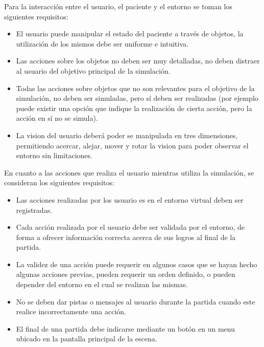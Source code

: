 Para la interacción entre el usuario, el paciente y el entorno se toman los
siguientes requisitos:

\begin{itemize}
\item El usuario puede manipular el estado del paciente a través de objetos, la
    utilización de los mismos debe ser uniforme e intuitiva.

\item Las acciones sobre los objetos no deben ser muy detalladas, no deben
    distraer al usuario del objetivo principal de la simulación.

\item Todas las acciones sobre objetos que no son relevantes para el objetivo de
    la simulación, no deben ser simuladas, pero sí deben ser realizadas (por
    ejemplo puede existir una opción que indique la realización de cierta
    acción, pero la acción en sí no se simula).

\item La vision del usuario deberá poder se manipulada en tres dimensiones,
    permitiendo acercar, alejar, mover y rotar la vision para poder observar el
    entorno sin limitaciones.

\end{itemize}

En cuanto a las acciones que realiza el usuario mientras utiliza la simulación,
se consideran los siguientes requisitos:

\begin{itemize}
\item Las acciones realizadas por los usuario es en el entorno virtual deben ser
    registradas.

\item Cada acción realizada por el usuario debe ser validada por el entorno, de
    forma a ofrecer información correcta acerca de sus logros al final de la
    partida.

\item La validez de una acción puede requerir en algunos casos que se hayan
    hecho algunas acciones previas, pueden requerir un orden definido, o pueden
    depender del entorno en el cual se realizan las mismas.

\item No se deben dar pistas o mensajes al usuario durante la partida cuando
    este realice incorrectamente una acción.

\item El final de una partida debe indicarse mediante un botón en un menu
    ubicado en la pantalla principal de la escena.

\end{itemize}
